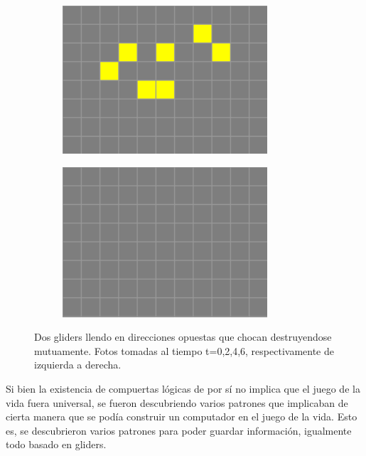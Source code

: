 \begin{figure}[b]
\begin{subfigure}{0.22\textwidth}
        \includegraphics[width=\textwidth]{images/life-glider-collission-3.png}
    \end{subfigure}
    \begin{subfigure}{0.22\textwidth}
        \includegraphics[width=\textwidth]{images/life-glider-collission-4.png}
    \end{subfigure}
    \caption{Dos gliders llendo en direcciones opuestas que chocan destruyendose mutuamente. Fotos tomadas al tiempo t=0,2,4,6, respectivamente de izquierda a derecha.}
    \label{figure:glider-collission}
\end{figure}

Si bien la existencia de compuertas l\'ogicas de por s\'i no implica que el juego de la vida fuera universal, se fueron descubriendo varios patrones que implicaban de cierta manera que se pod\'ia construir un computador en el juego de la vida. Esto es, se descubrieron varios patrones para poder guardar informaci\'on, igualmente todo basado en gliders.

